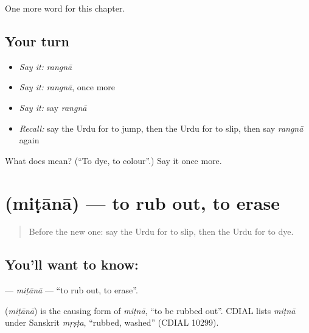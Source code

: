 \begin{grammarlens}[title={What you've built}]
One more word for this chapter.
\end{grammarlens}

\subsection*{Your turn}
\begin{itemize}
\raggedright
  \item \emph{Say it:} \emph{rangnā}
  \item \emph{Say it:} \emph{rangnā}, once more
  \item \emph{Say it:} say \emph{rangnā}
  \item \emph{Recall:} say the Urdu for to jump, then the Urdu for to slip, then say \emph{rangnā} again
\end{itemize}

\begin{tcolorbox}[breakable,colback=teal!4,colframe=teal!35!black,title={Before you move on}]
What does  mean? (\textquotedblleft{}To dye, to colour\textquotedblright{}.) Say it once more.
\end{tcolorbox}
\section[\texorpdfstring{\ur{مٹانا} (miṭānā)}{مٹانا (miṭānā)}]{ (miṭānā) — to rub out, to erase}

\label{lesson:UR-C150-mitana}



\begin{quote}
Before the new one: say the Urdu for to slip, then the Urdu for to dye.
\end{quote}

\subsection*{You'll want to know: }
\textbf{} — \emph{miṭānā} — \textquotedblleft{}to rub out, to erase\textquotedblright{}.

\begin{cousinweb}
\textbf{} (\emph{miṭānā}) is the causing form of \emph{miṭnā}, \textquotedblleft{}to be rubbed out\textquotedblright{}. CDIAL lists \emph{miṭnā} under Sanskrit \emph{mṛṣṭa}, \textquotedblleft{}rubbed, washed\textquotedblright{} (CDIAL 10299).
\end{cousinweb}

